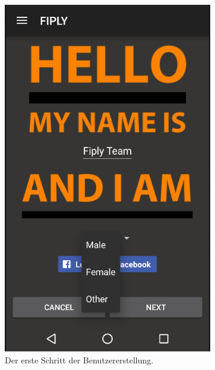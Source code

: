 \documentclass[FIPLY_base.tex]{subfiles}
\begin{document}
\begin{figure}[H]
	\begin{subfigure}[b]{0.5\textwidth}
		\includegraphics[scale=0.5]{img/User_step1}
		\caption{Der erste Schritt der Benutzererstellung.}
	\end{subfigure}
	\hfil
	\begin{subfigure}[b]{0.6\textwidth}

\end{subfigure}
\end{figure}
\end{document}
